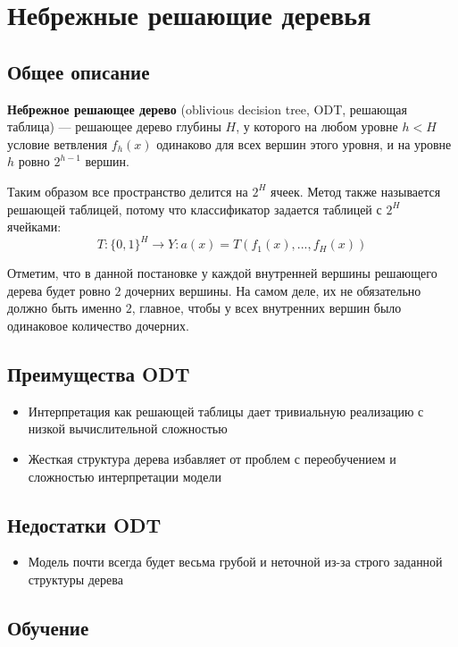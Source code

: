 \section{Небрежные решающие деревья}

\subsection{Общее описание}

\textbf{Небрежное решающее дерево} (oblivious decision tree, ODT, решающая таблица) --- решающее дерево глубины $H$,
у которого на любом уровне $h < H$ условие ветвления $f_h(x)$ одинаково для всех вершин этого уровня, и на 
уровне $h$ ровно $2^{h-1}$ вершин.

Таким образом все пространство делится на $2^H$ ячеек. Метод также называется решающей таблицей, потому что классификатор
задается таблицей с $2^H$ ячейками:
\begin{equation*}
    T: \{0, 1\}^H \rightarrow Y: a(x) = T(f_1(x), ..., f_H(x))
\end{equation*}

Отметим, что в данной постановке у каждой внутренней вершины решающего дерева будет ровно $2$ дочерних вершины. На самом деле,
их не обязательно должно быть именно $2$, главное, чтобы у всех внутренних вершин было одинаковое количество дочерних.

\subsection{Преимущества ODT}
\begin{itemize}
    \item Интерпретация как решающей таблицы дает тривиальную реализацию с низкой вычислительной сложностью
    \item Жесткая структура дерева избавляет от проблем с переобучением и сложностью интерпретации модели
\end{itemize}

\subsection{Недостатки ODT}
\begin{itemize}
    \item Модель почти всегда будет весьма грубой и неточной из-за строго заданной структуры дерева
\end{itemize}

\subsection{Обучение}

